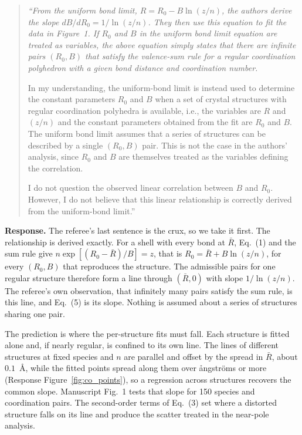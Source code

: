 \documentclass[11pt]{article}
\newenvironment{refquote}%
  {\begin{quote}\itshape\color{black!70}}%
  {\end{quote}}
\begin{document}
\begin{refquote}
``From the uniform bond limit, $R=R_0-B\ln(z/n)$, the authors derive
the slope $dB/dR_0=1/\ln(z/n)$.  They then use this equation to fit
the data in Figure~1.  If $R_0$ and $B$ in the uniform bond limit
equation are treated as variables, the above equation simply states
that there are infinite pairs $(R_0,B)$ that satisfy the valence-sum
rule for a regular coordination polyhedron with a given bond distance
and coordination number.

In my understanding, the uniform-bond limit is instead used to
determine the constant parameters $R_0$ and $B$ when a set of crystal
structures with regular coordination polyhedra is available, i.e.,
the variables are $R$ and $(z/n)$ and the constant parameters
obtained from the fit are $R_0$ and $B$.  The uniform bond limit
assumes that a series of structures can be described by a single
$(R_0,B)$ pair.  This is not the case in the authors' analysis, since
$R_0$ and $B$ are themselves treated as the variables defining the
correlation.

I do not question the observed linear correlation between $B$ and
$R_0$.  However, I do not believe that this linear relationship is
correctly derived from the uniform-bond limit.''
\end{refquote}

\textbf{Response.}  The referee's last sentence is the crux, so we
take it first.  The relationship is derived exactly.  For a shell
with every bond at $\bar R$, Eq.~(1) and the sum rule give
$n\exp[(R_0-\bar R)/B]=z$, that is $R_0=\bar R+B\ln(z/n)$, for every
$(R_0,B)$ that reproduces the structure.  The admissible pairs for
one regular structure therefore form a line through $(\bar R,0)$ with
slope $1/\ln(z/n)$.  The referee's own observation, that infinitely
many pairs satisfy the sum rule, is this line, and Eq.~(5) is its
slope.  Nothing is assumed about a series of structures sharing one
pair.

The prediction is where the per-structure fits must fall.  Each
structure is fitted alone and, if nearly regular, is confined to its
own line.  The lines of different structures at fixed species and
$n$ are parallel and offset by the spread in $\bar R$, about
$0.1$~\AA, while the fitted points spread along them over
\aa ngstr\"oms or more (Response Figure~\ref{fig:co_points}), so a
regression across structures recovers the common slope.  Manuscript
Fig.~1 tests that slope for 150 species and coordination pairs.  The
second-order terms of Eq.~(3) set where a distorted structure falls
on its line and produce the scatter treated in the near-pole
analysis.
\end{document}
